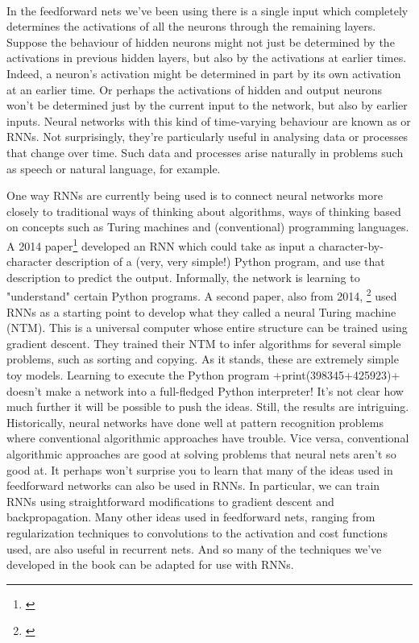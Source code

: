 \paragraph{} In the feedforward nets we've been using there is a single input which completely determines the activations of all the neurons through the remaining layers. Suppose the behaviour of hidden neurons might not just be determined by the activations in previous hidden layers, but also by the activations at earlier times. Indeed, a neuron's activation might be determined in part by its own activation at an earlier time.  Or perhaps the activations of hidden and output neurons won't be determined just by the current input to the network, but also by earlier inputs. Neural networks with this kind of time-varying behaviour are known as  or RNNs. Not surprisingly, they're particularly useful in analysing data or processes that change over time. Such data and processes arise naturally in problems such as speech or natural language, for example.

One way RNNs are currently being used is to connect neural networks more closely to traditional ways of thinking about algorithms, ways of thinking based on concepts such as Turing machines and (conventional) programming languages. A 2014 paper\footnote{\href{http://arxiv.org/abs/1410.4615}{}} developed an RNN which could take as input a character-by-character description of a (very, very simple!) Python program, and use that description to predict the output. Informally, the network is learning to "understand" certain Python programs. A second paper, also from 2014, \footnote{\href{http://arxiv.org/abs/1410.5401}{}} used RNNs as a starting point to develop what they called a neural Turing machine (NTM). This is a universal computer whose entire structure can be trained using gradient descent. They trained their NTM to infer algorithms for several simple problems, such as sorting and copying. As it stands, these are extremely simple toy models. Learning to execute the Python program \cd+print(398345+425923)+ doesn't make a network into a full-fledged Python interpreter! It's not clear how much further it will be possible to push the ideas. Still, the results are intriguing. Historically, neural networks have done well at pattern recognition problems where conventional algorithmic approaches have trouble. Vice versa, conventional algorithmic approaches are good at solving problems that neural nets aren't so good at. It perhaps won't surprise you to learn that many of the ideas used in feedforward networks can also be used in RNNs. In particular, we can train RNNs using straightforward modifications to gradient descent and backpropagation. Many other ideas used in feedforward nets, ranging from regularization techniques to convolutions to the activation and cost functions used, are also useful in recurrent nets. And so many of the techniques we've developed in the book can be adapted for use with RNNs.

